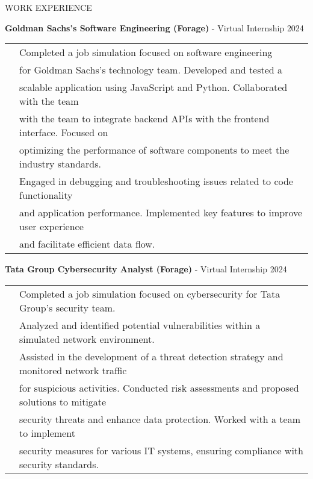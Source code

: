 \documentclass{resume}
\begin{document}

\begin{rSection}{WORK EXPERIENCE}
    \begin{itemize}
        {\bf Goldman Sachs's Software Engineering (Forage)} - Virtual Internship \hfill {2024}\\
        \begin{tabular}{>{\bfseries}l l}
            \textbf{} & Completed a job simulation focused on software engineering \\ &for Goldman Sachs's technology team. Developed and tested a \\
            & scalable application using JavaScript and Python. Collaborated with the team\\
            & with the team to integrate backend APIs with the frontend interface. Focused on\\
            & optimizing the performance of software components to meet the industry standards. \\
            & Engaged in debugging and troubleshooting issues related to code functionality  \\
            & and application performance. Implemented key features to improve user experience \\ &and facilitate efficient data flow. \\
        \end{tabular}
    \end{itemize}
    \begin{itemize}
        {\bf Tata Group Cybersecurity Analyst (Forage)} - Virtual Internship \hfill {2024}\\
        \begin{tabular}{>{\bfseries}l l}
            \textbf{} & Completed a job simulation focused on cybersecurity for Tata Group's security team. \\
            & Analyzed and identified potential vulnerabilities within a simulated network environment. \\
            & Assisted in the development of a threat detection strategy and monitored network traffic \\ & for suspicious activities. Conducted risk assessments and proposed solutions to mitigate\\
            & security threats and enhance data protection. Worked with a team to implement\\
            & security measures for various IT systems, ensuring compliance with security standards. \\
        \end{tabular}
    \end{itemize}
    
\end{rSection}
\end{document}
